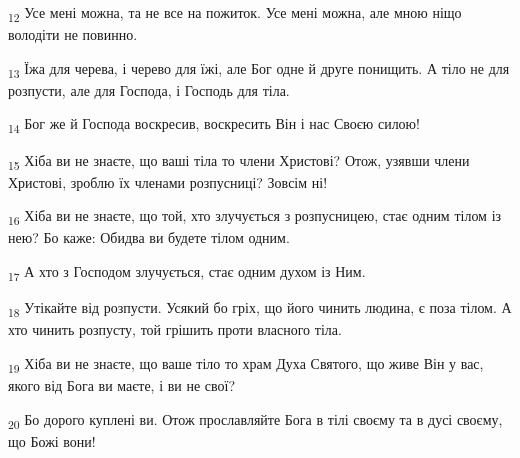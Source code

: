 \begin{tcolorbox}
\textsubscript{12} Усе мені можна, та не все на пожиток. Усе мені можна, але мною ніщо володіти не повинно.
\end{tcolorbox}
\begin{tcolorbox}
\textsubscript{13} Їжа для черева, і черево для їжі, але Бог одне й друге понищить. А тіло не для розпусти, але для Господа, і Господь для тіла.
\end{tcolorbox}
\begin{tcolorbox}
\textsubscript{14} Бог же й Господа воскресив, воскресить Він і нас Своєю силою!
\end{tcolorbox}
\begin{tcolorbox}
\textsubscript{15} Хіба ви не знаєте, що ваші тіла то члени Христові? Отож, узявши члени Христові, зроблю їх членами розпусниці? Зовсім ні!
\end{tcolorbox}
\begin{tcolorbox}
\textsubscript{16} Хіба ви не знаєте, що той, хто злучується з розпусницею, стає одним тілом із нею? Бо каже: Обидва ви будете тілом одним.
\end{tcolorbox}
\begin{tcolorbox}
\textsubscript{17} А хто з Господом злучується, стає одним духом із Ним.
\end{tcolorbox}
\begin{tcolorbox}
\textsubscript{18} Утікайте від розпусти. Усякий бо гріх, що його чинить людина, є поза тілом. А хто чинить розпусту, той грішить проти власного тіла.
\end{tcolorbox}
\begin{tcolorbox}
\textsubscript{19} Хіба ви не знаєте, що ваше тіло то храм Духа Святого, що живе Він у вас, якого від Бога ви маєте, і ви не свої?
\end{tcolorbox}
\begin{tcolorbox}
\textsubscript{20} Бо дорого куплені ви. Отож прославляйте Бога в тілі своєму та в дусі своєму, що Божі вони!
\end{tcolorbox}
